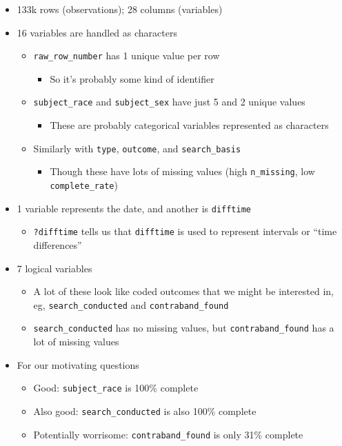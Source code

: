 \documentclass[
]{article}
\providecommand{\tightlist}{%
  \setlength{\itemsep}{0pt}\setlength{\parskip}{0pt}}
\begin{document}
\begin{itemize}
\tightlist
\item
  133k rows (observations); 28 columns (variables)
\item
  16 variables are handled as characters

  \begin{itemize}
  \tightlist
  \item
    \texttt{raw\_row\_number} has 1 unique value per row

    \begin{itemize}
    \tightlist
    \item
      So it's probably some kind of identifier
    \end{itemize}
  \item
    \texttt{subject\_race} and \texttt{subject\_sex} have just 5 and 2 unique values

    \begin{itemize}
    \tightlist
    \item
      These are probably categorical variables represented as characters
    \end{itemize}
  \item
    Similarly with \texttt{type}, \texttt{outcome}, and \texttt{search\_basis}

    \begin{itemize}
    \tightlist
    \item
      Though these have lots of missing values (high \texttt{n\_missing}, low \texttt{complete\_rate})
    \end{itemize}
  \end{itemize}
\item
  1 variable represents the date, and another is \texttt{difftime}

  \begin{itemize}
  \tightlist
  \item
    \texttt{?difftime} tells us that \texttt{difftime} is used to represent intervals or ``time differences''
  \end{itemize}
\item
  7 logical variables

  \begin{itemize}
  \tightlist
  \item
    A lot of these look like coded outcomes that we might be interested in, eg, \texttt{search\_conducted} and \texttt{contraband\_found}
  \item
    \texttt{search\_conducted} has no missing values, but \texttt{contraband\_found} has a lot of missing values
  \end{itemize}
\item
  For our motivating questions

  \begin{itemize}
  \tightlist
  \item
    Good: \texttt{subject\_race} is 100\% complete
  \item
    Also good: \texttt{search\_conducted} is also 100\% complete
  \item
    Potentially worrisome: \texttt{contraband\_found} is only 31\% complete
  \end{itemize}
\end{itemize}
\end{document}
